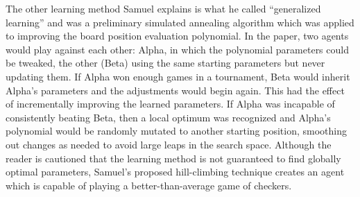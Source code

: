 The other learning method Samuel explains is what he called
``generalized learning''
and was a preliminary simulated annealing algorithm
which was applied to improving the board position evaluation polynomial.
%
In the paper,
two agents would play against each other:
Alpha, in which the polynomial parameters could be tweaked,
the other (Beta) using the same starting parameters but never updating them.
%
If Alpha won enough games in a tournament,
Beta would inherit Alpha's parameters and the adjustments would begin again.
%
This had the effect of incrementally improving the learned parameters.
%
If Alpha was incapable of consistently beating Beta,
then a local optimum was recognized and Alpha's polynomial would be randomly
mutated to another starting position,
smoothing out changes as needed to avoid large leaps in the search space.
%
Although the reader is cautioned that the learning method is not guaranteed to
find globally optimal parameters,
Samuel's proposed hill-climbing technique creates an agent which is capable
of playing a better-than-average game of checkers.

